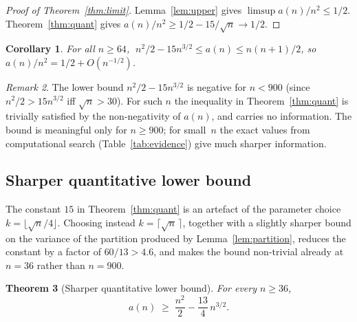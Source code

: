 ﻿\documentclass[11pt,a4paper]{article}
\theoremstyle{plain}
\newtheorem{theorem}{Theorem}
\newtheorem{corollary}[theorem]{Corollary}
\theoremstyle{definition}
\theoremstyle{remark}
\newtheorem{remark}[theorem]{Remark}
\begin{document}
\begin{proof}[Proof of Theorem~\ref{thm:limit}]
Lemma~\ref{lem:upper} gives $\limsup a(n)/n^2\le1/2$.
Theorem~\ref{thm:quant} gives $a(n)/n^2\ge1/2-15/\sqrt{n}\to1/2$.
\end{proof}

\begin{corollary}\label{cor:rate}
For all $n\ge64$, $\;n^2/2-15n^{3/2}\le a(n)\le n(n+1)/2$, so
$a(n)/n^2=1/2+O(n^{-1/2})$.
\end{corollary}

\begin{remark}
The lower bound $n^2/2-15n^{3/2}$ is negative for $n<900$ (since
$n^2/2>15n^{3/2}$ iff $\sqrt{n}>30$).  For such $n$ the inequality in
Theorem~\ref{thm:quant} is trivially satisfied by the non-negativity of
$a(n)$, and carries no information.  The bound is meaningful only for
$n\ge900$; for small~$n$ the exact values from computational search
(Table~\ref{tab:evidence}) give much sharper information.
\end{remark}

\subsection{Sharper quantitative lower bound}\label{sec:quant-sharp}

The constant $15$ in Theorem~\ref{thm:quant} is an artefact of the
parameter choice $k=\lfloor\sqrt n/4\rfloor$.  Choosing instead
$k=\lceil\sqrt n\,\rceil$, together with a slightly sharper bound on
the variance of the partition produced by Lemma~\ref{lem:partition},
reduces the constant by a factor of $60/13>4.6$, and makes the bound
non-trivial already at $n=36$ rather than $n=900$.

\begin{theorem}[Sharper quantitative lower bound]\label{thm:quant-sharp}
For every $n\ge 36$,
\[
  a(n)\;\ge\;\frac{n^2}{2}-\frac{13}{4}\,n^{3/2}.
\]
\end{theorem}
\end{document}
